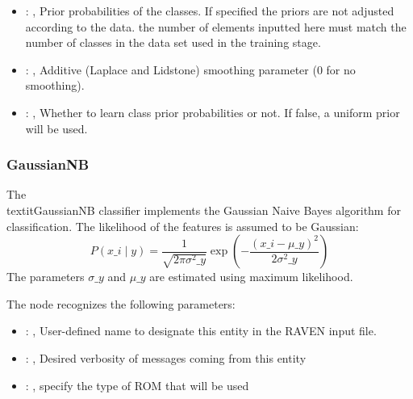 \begin{itemize}
    \item {}: , 
      Prior probabilities of the classes. If specified the priors are
      not adjusted according to the data. \nb the number of elements inputted here must
      match the number of classes in the data set used in the training stage.

    \item {}: , 
      Additive (Laplace and Lidstone) smoothing parameter (0 for no smoothing).

    \item {}: , 
      Whether to learn class prior probabilities or not. If false, a uniform
      prior will be used.
  \end{itemize}


\subsubsection{GaussianNB}
  The \\textit{GaussianNB} classifier implements the Gaussian Naive Bayes
  algorithm for classification.                          The likelihood of the features is assumed
  to be Gaussian:                          \begin{equation}                              P(x\_i \mid
  y) = \frac{1}{\sqrt{2\pi\sigma^2\_y}} \exp\left(-\frac{(x\_i -
  \mu\_y)^2}{2\sigma^2\_y}\right)                          \end{equation}                          The
  parameters $\sigma\_y$ and $\mu\_y$ are estimated using maximum likelihood.

  The  node recognizes the following parameters:
    \begin{itemize}
      \item {}: , 
        User-defined name to designate this entity in the RAVEN input file.
      \item {}: , 
        Desired verbosity of messages coming from this entity
      \item {}: , 
        specify the type of ROM that will be used
  \end{itemize}

